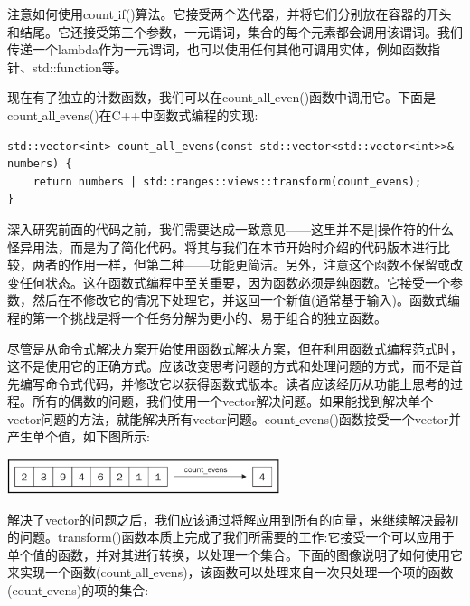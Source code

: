 注意如何使用count\underline{ }if()算法。它接受两个迭代器，并将它们分别放在容器的开头和结尾。它还接受第三个参数，一元谓词，集合的每个元素都会调用该谓词。我们传递一个lambda作为一元谓词，也可以使用任何其他可调用实体，例如函数指针、std::function等。 \par
现在有了独立的计数函数，我们可以在count\underline{ }all\underline{ }even()函数中调用它。下面是count\underline{ }all\underline{ }evens()在C++中函数式编程的实现: \par

\begin{lstlisting}[caption={}]
std::vector<int> count_all_evens(const std::vector<std::vector<int>>&
numbers) {
	return numbers | std::ranges::views::transform(count_evens);
}
\end{lstlisting}

深入研究前面的代码之前，我们需要达成一致意见——这里并不是|操作符的什么怪异用法，而是为了简化代码。将其与我们在本节开始时介绍的代码版本进行比较，两者的作用一样，但第二种——功能更简洁。另外，注意这个函数不保留或改变任何状态。这在函数式编程中至关重要，因为函数必须是纯函数。它接受一个参数，然后在不修改它的情况下处理它，并返回一个新值(通常基于输入)。函数式编程的第一个挑战是将一个任务分解为更小的、易于组合的独立函数。  \par
尽管是从命令式解决方案开始使用函数式解决方案，但在利用函数式编程范式时，这不是使用它的正确方式。应该改变思考问题的方式和处理问题的方式，而不是首先编写命令式代码，并修改它以获得函数式版本。读者应该经历从功能上思考的过程。所有的偶数的问题，我们使用一个vector解决问题。如果能找到解决单个vector问题的方法，就能解决所有vector问题。count\underline{ }evens()函数接受一个vector并产生单个值，如下图所示: \par

\begin{center}
	\includegraphics[width=0.6\textwidth]{content/Section-2/Chapter-7/2}
\end{center}

解决了vector的问题之后，我们应该通过将解应用到所有的向量，来继续解决最初的问题。transform()函数本质上完成了我们所需要的工作:它接受一个可以应用于单个值的函数，并对其进行转换，以处理一个集合。下面的图像说明了如何使用它来实现一个函数(count\underline{ }all\underline{ }evens)，该函数可以处理来自一次只处理一个项的函数(count\underline{ }evens)的项的集合: \par

